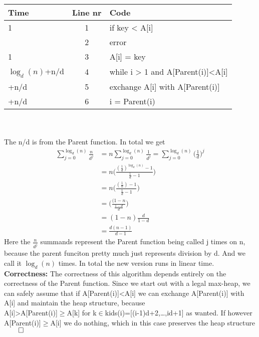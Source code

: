 \documentclass{article}
\theoremstyle{remark}
\numberwithin{equation}{section}
\begin{document}
\\\begin{tabular}{l | c | l}
	Time & Line nr & Code \\ \hline
	1 & 1 & if key < A[i] \\
	\indent 1 & 2 & \indent error \\
	1 & 3 & A[i] = key \\
	$\log_d(n)$+n/d & 4 & while i > 1 and A[Parent(i)]<A[i] \\
	\indent 3+n/d & 5 & \indent exchange A[i] with A[Parent(i)] \\
	\indent 1+n/d & 6 & \indent i = Parent(i) 
\end{tabular}\\\\
The n/d is from the Parent function. In total we get
\begin{align*}
	\sum_{j = 0}^{\log_d(n)} \frac{n}{d^j} &= n \sum_{j = 0}^{\log_d(n)} \frac{1}{d^j} = \sum_{j = 0}^{\log_d(n)} \bigg(\frac{1}{d}\bigg)^j\\
	&= n \bigg(\frac{(\frac{1}{d})^{\log_d(n)}-1}{\frac{1}{d}-1}\bigg) \\
	&= n\bigg(\frac{(\frac{1}{n})-1}{\frac{1}{d}-1}\bigg)\\
	&= \bigg(\frac{(1-n}{\frac{1-d}{d}}\bigg)\\
	&= (1-n)\frac{d}{1-d}\\
	& = \frac{d(n-1)}{d-1}
\end{align*}
Here the $\frac{n}{d^j}$ summands represent the Parent function being called j times on n, because the parent funciton pretty much just represents division by d. And we call it $\log_d(n)$ times. In total the new version runs in linear time.
\\\textbf{Correctness: }The correctness of this algorithm depends entirely on the correctness of the Parent function. Since we start out with a legal max-heap, we can safely assume that if A[Parent(i)]<A[i] we can exchange A[Parent(i)] with A[i] and maintain the heap structure, because\\ A[i]>A[Parent(i)]$\geq$A[k] for k$\in$kids(i)=[(i-1)d+2,\dots,id+1] as wanted. If however A[Parent(i)]$\geq$A[i] we do nothing, which in this case preserves the heap structure $\qed$
\end{document}
